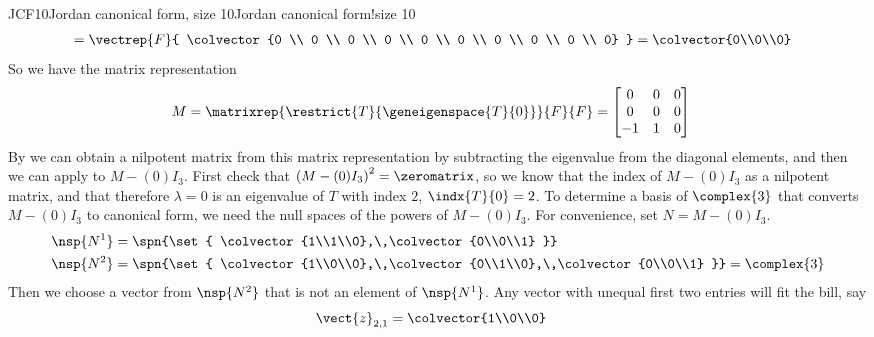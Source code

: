 \begin{example}{JCF10}{Jordan canonical form, size 10}{Jordan canonical form!size 10}
\begin{align*}
{}
&=
\vectrep{F}{
\colvector{0 \\ 0 \\ 0 \\ 0 \\ 0 \\ 0 \\ 0 \\ 0 \\ 0 \\ 0}
}
=\colvector{0\\0\\0}
%
\end{align*}
%
So we have the matrix representation
%
\begin{align*}
M&=\matrixrep{\restrict{T}{\geneigenspace{T}{0}}}{F}{F}
=
\begin{bmatrix}
0 & 0 & 0 \\
0 & 0 & 0 \\
-1 & 1 & 0
\end{bmatrix}
%
\end{align*}
%
By  we can obtain a nilpotent matrix from this matrix representation by subtracting the eigenvalue from the diagonal elements, and then we can apply  to $M-(0)I_3$.  First check that $\left(M-(0)I_3\right)^2=\zeromatrix$, so we know that the index of $M-(0)I_3$ as a nilpotent matrix, and that therefore $\lambda=0$ is an eigenvalue of $T$ with index $2$, $\indx{T}{0}=2$.  To determine a basis of $\complex{3}$ that converts $M-(0)I_3$ to canonical form, we need the null spaces of the powers of $M-(0)I_3$.  For convenience, set $N=M-(0)I_3$.
%
\begin{align*}
\nsp{N^1}&=\spn{\set{
\colvector{1\\1\\0},\,\colvector{0\\0\\1}
}}\\
%
\nsp{N^2}&=\spn{\set{
\colvector{1\\0\\0},\,\colvector{0\\1\\0},\,\colvector{0\\0\\1}
}}
=\complex{3}
\end{align*}
%
Then we choose a vector from $\nsp{N^2}$ that is not an element of $\nsp{N^1}$.  Any vector with unequal first two entries will fit the bill, say
%
\begin{align*}
\vect{z}_{2,1}&=\colvector{1\\0\\0}

\end{align*}
\end{example}
